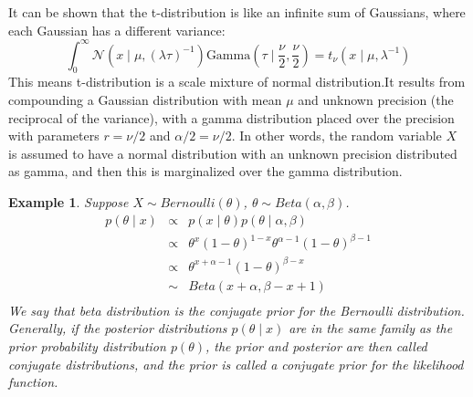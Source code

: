 \documentclass[11pt]{article}
\def\MN{{\mathcal N}}
\newtheorem{example}{Example}[section]
\begin{document}
It can be shown that the t-distribution is like an infinite sum of Gaussians, where each Gaussian has a different variance:
$$
\int_{0}^{\infty}\MN(x\mid\mu,(\lambda\tau)^{-1})\mbox{Gamma}(\tau\mid\frac{\nu}{2},\frac{\nu}{2})=t_\nu(x\mid\mu,\lambda^{-1})
$$
This means t-distribution is a scale mixture of normal distribution.It results from compounding a Gaussian distribution with mean $\mu$ and unknown precision (the reciprocal of the variance), with a gamma distribution placed over the precision with parameters $r = \nu/2$ and $\alpha/2 = \nu/2$. In other words, the random variable $X$ is assumed to have a normal distribution with an unknown precision distributed as gamma, and then this is marginalized over the gamma distribution.

\begin{example}
Suppose $X\sim Bernoulli(\theta)$, $\theta\sim Beta(\alpha,\beta)$.
\begin{eqnarray*}
p(\theta\mid x)&\propto& p(x\mid\theta)p(\theta\mid\alpha,\beta)\\
&\propto& \theta^x(1-\theta)^{1-x}\theta^{\alpha-1}(1-\theta)^{\beta-1} \\
&\propto& \theta^{x+\alpha-1}(1-\theta)^{\beta-x} \\
&\sim& Beta(x+\alpha, \beta-x+1) \\
\end{eqnarray*}
We say that beta distribution is the conjugate prior for the Bernoulli distribution. Generally, if the posterior distributions $p(\theta\mid x)$ are in the same family as the prior probability distribution $p(\theta)$, the prior and posterior are then called conjugate distributions, and the prior is called a conjugate prior for the likelihood function.
\end{example}
\end{document}
